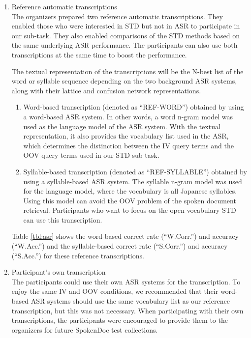 \documentclass[english]{jnlp_1.4}
\begin{document}
\begin{enumerate}
\item Reference automatic transcriptions \\
      The organizers prepared two reference automatic transcriptions. They
      enabled those who were interested in STD but not in ASR to
      participate in our sub-task. They also enabled comparisons of the STD
      methods based on the same underlying ASR performance. The
      participants can also use both transcriptions at the same time to
      boost the performance. 

      The textual representation of the transcriptions will be the N-best list
      of the word or syllable sequence depending on the two background
      ASR systems, along with their lattice and confusion network
      representations.

\begin{enumerate}
\item Word-based transcription (denoted as ``REF-WORD'') obtained by
      using a word-based ASR system. In other words, a word n-gram model
      was used as the language model of the ASR system. With the textual
      representation, it also provides the vocabulary list used in the
      ASR, which determines the distinction between the IV query terms 
      and the OOV query terms used in our STD sub-task. 
\item Syllable-based transcription (denoted as ``REF-SYLLABLE'')
      obtained by using a syllable-based ASR system. The syllable n-gram
      model was used for the language model, where the vocabulary is all
      Japanese syllables. Using this model can avoid the OOV problem of
      the spoken document retrieval. Participants who want to focus on
      the open-vocabulary STD can use this transcription. 
\end{enumerate}
Table \ref{tbl:asr} shows the word-based correct rate (``W.Corr.'') and
      accuracy (``W.Acc.'') and the syllable-based correct rate
      (``S.Corr.'') and accuracy (``S.Acc.'') for these reference
      transcriptions. 

\item Participant's own transcription \\
The participants could use their own ASR systems for the
      transcription. To enjoy the same IV and OOV conditions, we
      recommended that their word-based ASR systems should use the same
      vocabulary list as our reference transcription, but this was not
      necessary. When participating with their own transcriptions, the
      participants were encouraged to provide them to the organizers for
      future SpokenDoc test collections. 
\end{enumerate}
\end{document}
